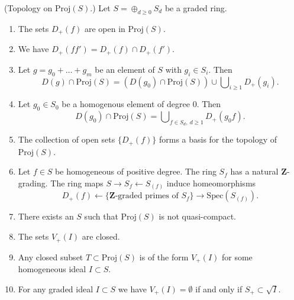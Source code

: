 \begin{lemma}
\label{lemma-topology-proj}
(Topology on $\text{Proj}(S)$.)
Let $S = \oplus_{d \geq 0} S_d$ be a graded ring.
\begin{enumerate}
\item The sets $D_{+}(f)$ are open in $\text{Proj}(S)$.
\item We have $D_{+}(ff') = D_{+}(f) \cap D_{+}(f')$.
\item Let $g = g_0 + \ldots + g_m$ be an element
of $S$ with $g_i \in S_i$. Then
$$
D(g) \cap \text{Proj}(S) =
(D(g_0) \cap \text{Proj}(S))
\cup
\bigcup\nolimits_{i \geq 1} D_{+}(g_i).
$$
\item
Let $g_0\in S_0$ be a homogenous element of degree $0$. Then
$$
D(g_0) \cap \text{Proj}(S)
=
\bigcup\nolimits_{f \in S_d, \ d\geq 1} D_{+}(g_0 f).
$$
\item The collection of open sets $\{D_{+}(f)\}$ forms a
basis for the topology of $\text{Proj}(S)$.
\item Let $f \in S$ be homogeneous of positive degree.
The ring $S_f$ has a natural $\mathbf{Z}$-grading.
The ring maps $S \to S_f \leftarrow S_{(f)}$ induce
homeomorphisms
$$
D_{+}(f)
\leftarrow
\{\mathbf{Z}\text{-graded primes of }S_f\}
\rightarrow
\text{Spec}(S_{(f)}).
$$
\item There exists an $S$ such that $\text{Proj}(S)$ is not
quasi-compact.
\item The sets $V_{+}(I)$ are closed.
\item Any closed subset $T \subset \text{Proj}(S)$ is of
the form $V_{+}(I)$ for some homogeneous ideal $I \subset S$.
\item For any graded ideal $I \subset S$ we have
$V_{+}(I) = \emptyset$ if and only if $S_{+} \subset \sqrt{I}$.
\end{enumerate}
\end{lemma}

